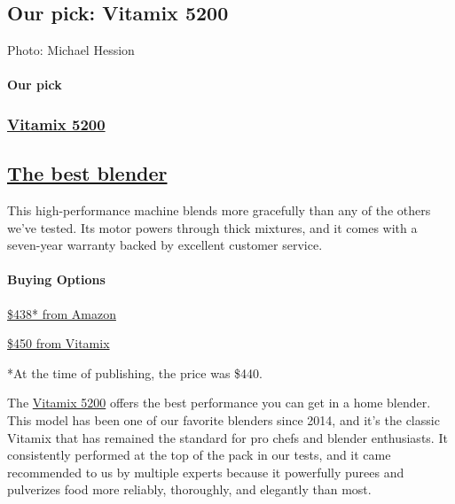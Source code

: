 \hypertarget{our-pick-vitamix-5200}{%
\subsection{Our pick: Vitamix 5200}\label{our-pick-vitamix-5200}}

Photo: Michael Hession

\hypertarget{our-pick-2}{%
\paragraph{Our pick}\label{our-pick-2}}

\href{https://www.nytimes3xbfgragh.onion/wirecutter/out/link/7761/112178/4/109194?merchant=Amazon}{}

\hypertarget{vitamix-5200-2}{%
\subsubsection{\texorpdfstring{\href{https://www.nytimes3xbfgragh.onion/wirecutter/out/link/7761/112178/4/109194?merchant=Amazon}{Vitamix
5200}}{Vitamix 5200}}\label{vitamix-5200-2}}

\hypertarget{the-best-blender-3}{%
\subsection{\texorpdfstring{\href{https://www.nytimes3xbfgragh.onion/wirecutter/out/link/7761/112178/4/109194?merchant=Amazon}{The
best blender}}{The best blender}}\label{the-best-blender-3}}

This high-performance machine blends more gracefully than any of the
others we've tested. Its motor powers through thick mixtures, and it
comes with a seven-year warranty backed by excellent customer service.

\hypertarget{buying-options-8}{%
\paragraph{Buying Options}\label{buying-options-8}}

\href{https://www.nytimes3xbfgragh.onion/wirecutter/out/link/7761/112178/4/109194?merchant=Amazon}{\$438*
from Amazon}

\href{https://www.nytimes3xbfgragh.onion/wirecutter/out/link/7761/149373/4/109194?merchant=Vitamix}{\$450
from Vitamix}

*At the time of publishing, the price was \$440.

The
\href{https://www.nytimes3xbfgragh.onion/wirecutter/out/link/7761/112178/4/69782/?merchant=Amazon}{Vitamix
5200} offers the best performance you can get in a home blender. This
model has been one of our favorite blenders since 2014, and it's the
classic Vitamix that has remained the standard for pro chefs and blender
enthusiasts. It consistently performed at the top of the pack in our
tests, and it came recommended to us by multiple experts because it
powerfully purees and pulverizes food more reliably, thoroughly, and
elegantly than most.

